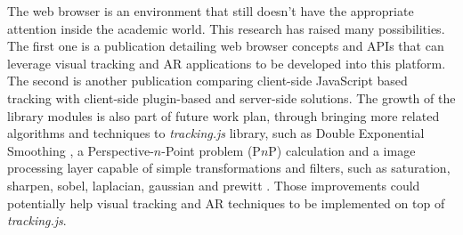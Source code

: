 The web browser is an environment that still doesn't have the appropriate attention inside the academic world. This research has raised many possibilities. The first one is a publication detailing web browser concepts and APIs that can leverage visual tracking and AR applications to be developed into this platform. The second is another publication comparing client-side JavaScript based tracking with client-side plugin-based and server-side solutions. The growth of the library modules is also part of future work plan, through bringing more related algorithms and techniques to \textit{tracking.js} library, such as Double Exponential Smoothing \cite{LaViola2003}, a Perspective-$n$-Point problem (P$n$P) calculation and a image processing layer capable of simple transformations and filters, such as saturation, sharpen, sobel, laplacian, gaussian and prewitt \cite{Gonzalez2007}. Those improvements could potentially help visual tracking and AR techniques to be implemented on top of \textit{tracking.js}.


